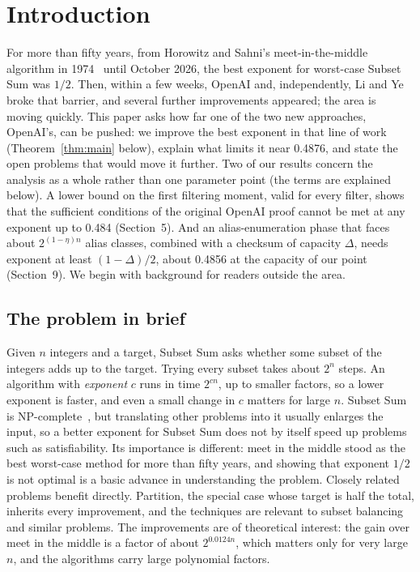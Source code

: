 \documentclass[11pt]{article}
\theoremstyle{plain}
\begin{document}
\section{Introduction}

For more than fifty years, from Horowitz and Sahni's meet-in-the-middle algorithm in 1974~\cite{hs} until October 2026, the best exponent for worst-case Subset Sum was $1/2$. Then, within a few weeks, OpenAI and, independently, Li and Ye broke that barrier, and several further improvements appeared; the area is moving quickly. This paper asks how far one of the two new approaches, OpenAI's, can be pushed: we improve the best exponent in that line of work (Theorem~\ref{thm:main} below), explain what limits it near 0.4876, and state the open problems that would move it further. Two of our results concern the analysis as a whole rather than one parameter point (the terms are explained below). A lower bound on the first filtering moment, valid for every filter, shows that the sufficient conditions of the original OpenAI proof cannot be met at any exponent up to 0.484 (Section~5). And an alias-enumeration phase that faces about $2^{(1-\eta)n}$ alias classes, combined with a checksum of capacity $\Delta$, needs exponent at least $(1 - \Delta)/2$, about 0.4856 at the capacity of our point (Section~9). We begin with background for readers outside the area.

\subsection*{The problem in brief}
Given $n$ integers and a target, Subset Sum asks whether some subset of the integers adds up to the target. Trying every subset takes about $2^n$ steps. An algorithm with \emph{exponent} $c$ runs in time $2^{cn}$, up to smaller factors, so a lower exponent is faster, and even a small change in $c$ matters for large $n$. Subset Sum is NP-complete~\cite{karp}, but translating other problems into it usually enlarges the input, so a better exponent for Subset Sum does not by itself speed up problems such as satisfiability. Its importance is different: meet in the middle stood as the best worst-case method for more than fifty years, and showing that exponent $1/2$ is not optimal is a basic advance in understanding the problem. Closely related problems benefit directly. Partition, the special case whose target is half the total, inherits every improvement, and the techniques are relevant to subset balancing and similar problems. The improvements are of theoretical interest: the gain over meet in the middle is a factor of about $2^{0.0124n}$, which matters only for very large $n$, and the algorithms carry large polynomial factors.
\end{document}
